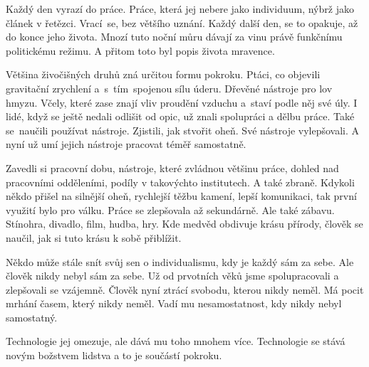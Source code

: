 \documentclass{article}
\begin{document}
	\fontsize{10pt}{10pt}\selectfont
	Každý den vyrazí do práce.
	Práce, která jej nebere jako individuum, nýbrž jako článek v řetězci.
	Vrací~se, bez většího uznání.
	Každý další den, se to opakuje, až do konce jeho života.
	Mnozí tuto noční můru dávají za vinu právě funkčnímu politickému režimu.
	A přitom toto byl popis života mravence.\par
	Většina živočišných druhů zná určitou formu pokroku.
	Ptáci, co objevili gravitační zrychlení a~s~tím~spojenou sílu úderu.
	Dřevěné nástroje pro lov hmyzu.
	Včely, které zase znají vliv proudění vzduchu a~staví podle něj své úly.
	I lidé, když se ještě nedali odlišit od opic, už znali spolupráci a dělbu práce.
	Také se~naučili používat nástroje.
	Zjistili, jak stvořit oheň.
	Své nástroje vylepšovali.
	A nyní už umí jejich nástroje pracovat téměř samostatně.\par
	Zavedli si pracovní dobu, nástroje, které zvládnou většinu práce, dohled nad pracovními odděleními, podíly v takovýchto institutech.
	A také zbraně.
	Kdykoli někdo přišel na silnější oheň, rychlejší těžbu kamení, lepší komunikaci, tak první využití bylo pro válku.
	Práce se zlepšovala až sekundárně.
	Ale také zábavu.
	Stínohra, divadlo, film, hudba, hry.
	Kde medvěd obdivuje krásu přírody, člověk se naučil, jak si tuto krásu k sobě přiblížit.\par
	Někdo může stále snít svůj sen o individualismu, kdy je každý sám za sebe.
	Ale člověk nikdy nebyl sám za sebe.
	Už od prvotních věků jsme spolupracovali a zlepšovali se vzájemně.
	Člověk nyní ztrácí svobodu, kterou nikdy neměl.
	Má pocit mrhání časem, který nikdy neměl.
	Vadí mu nesamostatnost, kdy nikdy nebyl samostatný.\par
	Technologie jej omezuje, ale dává mu toho mnohem více.
	Technologie se stává novým božstvem lidstva a to je součástí pokroku.
\end{document}
